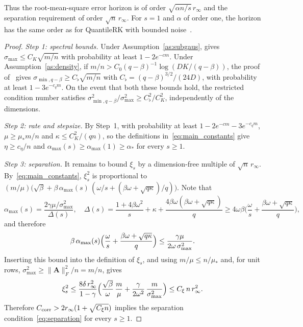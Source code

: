 \documentclass[pdflatex,sn-mathphys-num]{sn-jnl}
\theoremstyle{thmstyleone}
\theoremstyle{thmstylethree}
\newcommand{\proofstep}[1]{\par\medskip\noindent\emph{#1}}
\newcommand{\mA}{\mathbf{A}}
\begin{document}
Thus the root-mean-square error horizon is of order $\sqrt{\alpha n/s}\,r_\infty$ and
the separation requirement of order $\sqrt n\,r_\infty$. For $s=1$ and $\alpha$ of order one,
the horizon has the same order as for QuantileRK with bounded
noise~\cite[Theorem~II.1]{jarman2021quantilerk}.

\begin{proof}
\proofstep{Step 1: spectral bounds.} Under Assumption~\ref{as:subgaus},
\cite[Theorem~3.1]{haddock2022quantilebased} gives
$\sigma_{\max}\le C_K\sqrt{m/n}$ with probability at least $1-2e^{-cm}$.
Under Assumption~\ref{as:density}, if
$m/n>C_0(q-\beta)^{-1}\log(DK/(q-\beta))$, the proof
of~\cite[Proposition~3.4]{haddock2022quantilebased} gives
$\sigma_{\min,q-\beta}\ge C_\flat\sqrt{m/n}$ with
$C_\flat=(q-\beta)^{3/2}/(24D)$, with probability at least $1-3e^{-c_qm}$. On the event that both these bounds hold, 
the restricted condition number satisfies
$\sigma_{\min,q-\beta}^2/\sigma_{\max}^2\ge C_\flat^2/C_K^2$, independently of
the dimensions.

\proofstep{Step 2: rate and stepsize.} By Step~1, with probability at least $1-2e^{-cm}-3e^{-c_qm}$, 
$\mu\ge\mu_*m/n$ and $\kappa\le C_K^2/(qn)$, so the definitions
in~\eqref{eq:main_constants} give $\eta\ge c_\eta/n$ and
$\alpha_{\max}(s)\ge\alpha_{\max}(1)\ge\alpha_*$ for every $s\ge1$.

\proofstep{Step 3: separation.} It remains to bound $\xi_s$ by a
dimension-free multiple of $\sqrt n\,r_\infty$. By~\eqref{eq:main_constants},
$\xi_s^2$ is proportional to
$(m/\mu)\bigl(\sqrt\beta+\beta\,\alpha_{\max}(s)\,(\omega/s
+(\beta\omega+\sqrt{q\kappa})/q)\bigr)$. Note that
\[
\alpha_{\max}(s)=\frac{2\gamma\mu/\sigma_{\max}^2}{\Delta(s)},
\quad
\Delta(s)=\frac{1+4\beta\omega^2}{s}+\kappa
+\frac{4\beta\omega(\beta\omega+\sqrt{q\kappa})}{q} \ge 4\omega\beta\bigl(\frac{\omega}{s}+\frac{\beta\omega+\sqrt{q\kappa}}{q}\bigr),
\]
and therefore
\[
\beta\,\alpha_{\max}(s)\Bigl(\frac\omega s
+\frac{\beta\omega+\sqrt{q\kappa}}{q}\Bigr)
\le\frac{\gamma\mu}{2\omega\,\sigma_{\max}^2}.
\]
Inserting this bound into the definition of $\xi_s$, and using
$m/\mu\le n/\mu_*$ and, for unit rows, $\sigma_{\max}^2\ge\|\mA\|_F^2/n=m/n$,
gives
\[
\xi_s^2\le\frac{8\delta\,r_\infty^2}{1-\gamma}
\Bigl(\frac{\sqrt\beta}{\omega}\,\frac m\mu
+\frac{\gamma}{2\omega^2}\,\frac{m}{\sigma_{\max}^2}\Bigr)
\le C_\xi\,n\,r_\infty^2 .
\]
Therefore $C_{\rm corr}>2r_\infty(1+\sqrt{C_\xi n})$ implies the separation
condition~\eqref{eq:separation} for every $s\ge1$.

\end{proof}
\end{document}
